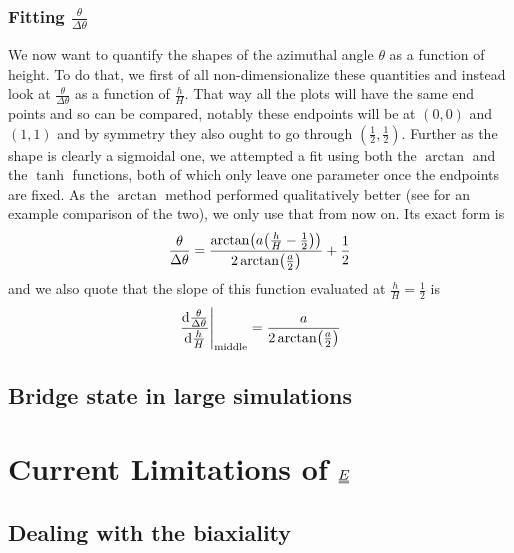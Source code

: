 \documentclass[12pt]{article}
\newcommand{\duf}[2]{\stackunder[0.5pt]{\stackunder[0.8pt]{\stackunder[1pt]{\ensuremath{#1}}{\rule{\widthof{\ensuremath{#2}}*\real{0.9}}{.1ex}}}{\rule{\widthof{\ensuremath{#2}}*\real{0.9}}{.1ex}}}{}}
\newcommand{\du}[1]{\duf{#1}{#1}}
\newcommand{\EE}{\ensuremath{\du{E}}}
\begin{document}
    \subsubsection{Fitting $\frac{\theta}{\Delta\theta}$}
    We now want to quantify the shapes of the azimuthal angle $\theta$ as a function of height.
    To do that, we first of all non-dimensionalize these quantities and instead look at $\frac{\theta}{\Delta\theta}$ as a function of $\frac{h}{H}$.
    That way all the plots will have the same end points and so can be compared, notably these endpoints will be at $(0, 0)$ and $(1, 1)$ and by symmetry they also ought to go through $(\frac{1}{2}, \frac{1}{2})$.
    Further as the shape is clearly a sigmoidal one, we attempted a fit using both the $\arctan$ and the $\tanh$ functions, both of which only leave one parameter once the endpoints are fixed.
    As the $\arctan$ method performed qualitatively better (see  for an example comparison of the two), we only use that from now on.
    Its exact form is
    \begin{equation}
        \frac{\theta}{\Delta\theta} = \frac{\arctan(a \qty(\frac{h}{H} - \frac{1}{2}))}{2\arctan(\frac{a}{2})} + \frac{1}{2}
    \end{equation}
    and we also quote that the slope of this function evaluated at $\frac{h}{H} = \frac{1}{2}$ is
    \begin{equation}
        \eval{\dv{\frac{\theta}{\Delta\theta}}{\frac{h}{H}}}_\text{middle} = \frac{a}{2\arctan(\frac{a}{2})}
    \end{equation}
    \subsection{Bridge state in large simulations}

\section{Current Limitations of \EE}
    \subsection{Dealing with the biaxiality}
\end{document}
